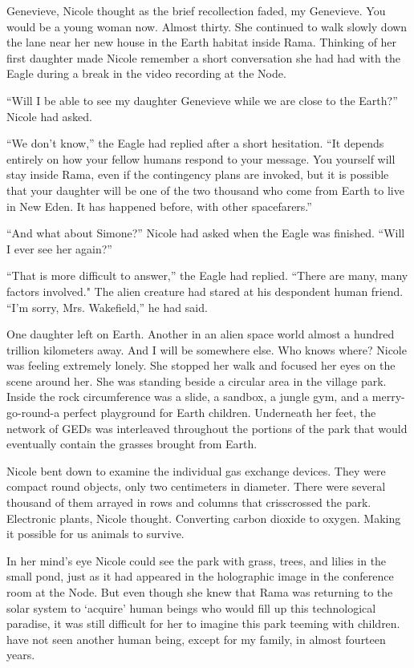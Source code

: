 \documentclass[]{article}
\begin{document}
{Genevieve, Nicole thought as the brief recollection faded, my Genevieve.  You would be a young woman now.  Almost thirty.  She continued to walk slowly down the lane near her new house in the Earth habitat inside Rama.  Thinking of her first daughter made Nicole remember a short conversation she had had with the Eagle during a break in the video recording at the Node.

“Will I be able to see my daughter Genevieve while we are close to the Earth?” Nicole had asked.

“We don’t know,” the Eagle had replied after a short hesitation.  “It depends entirely on how your fellow humans respond to your message.  You yourself will stay inside Rama, even if the contingency plans are invoked, but it is possible that your daughter will be one of the two thousand who come from Earth to live in New Eden.  It has happened before, with other spacefarers.”

“And what about Simone?” Nicole had asked when the Eagle was finished.  “Will I ever see her again?”

“That is more difficult to answer,” the Eagle had replied.  “There are many, many factors involved."  The alien creature had stared at his despondent human friend.  “I’m sorry, Mrs.  Wakefield,” he had said.

One daughter left on Earth.  Another in an alien space world almost a hundred trillion kilometers away.  And I will be somewhere else.  Who knows where? Nicole was feeling extremely lonely.  She stopped her walk and focused her eyes on the scene around her.  She was standing beside a circular area in the village park.  Inside the rock circumference was a slide, a sandbox, a jungle gym, and a merry-go-round-a perfect playground for Earth children.  Underneath her feet, the network of GEDs was interleaved throughout the portions of the park that would eventually contain the grasses brought from Earth.

Nicole bent down to examine the individual gas exchange devices.  They were compact round objects, only two centimeters in diameter.  There were several thousand of them arrayed in rows and columns that crisscrossed the park.  Electronic plants, Nicole thought.  Converting carbon dioxide to oxygen.  Making it possible for us animals to survive.

In her mind’s eye Nicole could see the park with grass, trees, and lilies in the small pond, just as it had appeared in the holographic image in the conference room at the Node.  But even though she knew that Rama was returning to the solar system to  ‘acquire' human beings who would fill up this technological paradise, it was still difficult for her to imagine this park teeming with children.  have not seen another human being, except for my family, in almost fourteen years.

}
\end{document}
